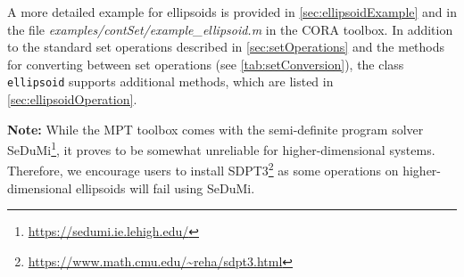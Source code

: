 A more detailed example for ellipsoids is provided in \cref{sec:ellipsoidExample} and in the file \textit{examples/contSet/example\_ellipsoid.m} in the CORA toolbox. In addition to the standard set operations described in \cref{sec:setOperations} and the methods for converting between set operations (see \cref{tab:setConversion}), the class \texttt{ellipsoid} supports additional methods, which are listed in \cref{sec:ellipsoidOperation}.

\textbf{Note:} While the MPT toolbox comes with the semi-definite program solver SeDuMi\footnote{\url{https://sedumi.ie.lehigh.edu/}}, it proves to be somewhat unreliable for higher-dimensional systems. Therefore, we encourage users to install SDPT3\footnote{\url{https://www.math.cmu.edu/~reha/sdpt3.html}} as some operations on higher-dimensional ellipsoids will fail using SeDuMi.
